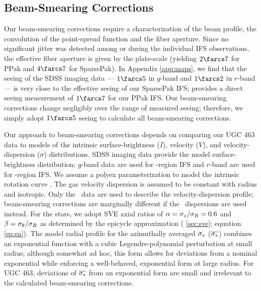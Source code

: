 \documentclass[apj,iop,numberedappendix]{emulateapj}
\begin{document}
\subsection{Beam-Smearing Corrections}
\label{sec:beamc}

Our beam-smearing corrections require a characterization of the beam profile,
the convolution of the point-spread function and the fiber aperture.  Since no
significant jitter was detected among or during the individual IFS observations,
the effective fiber aperture is given by the plate-scale (yielding $2\farcs7$
for PPak and $4\farcs7$ for SparsePak).  In Appendix \ref{app:maps}, we find
that the seeing of the SDSS imaging data --- $1\farcs5$ in $g$-band and
$1\farcs2$ in $r$-band --- is very close to the effective seeing of our
SparsePak IFS; \citet{TPKMPhD} provides a direct seeing measurement of
$1\farcs7$ for our PPak IFS.  Our beam-smearing corrections change negligibly
over the range of measured seeing; therefore, we simply adopt $1\farcs5$ seeing
to calculate all beam-smearing corrections.

Our approach to beam-smearing corrections 
depends on comparing our UGC 463 data to models of the intrinsic
surface-brightness ($I$), velocity ($V$), and velocity-dispersion ($\sigma$)
distributions.  SDSS imaging data provide the model surface-brightness
distribution; $g$-band data are used for \mgi-region IFS and $r$-band are used
for \halp-region IFS.  We assume a polyex parameterization to model the
intrinsic rotation curve \citep{2002ApJ...571L.107G}.  The gas velocity
dispersion is assumed to be constant with radius and isotropic.  Only the \halp\
data are used to describe the velocity-dispersion profile; beam-smearing
corrections are marginally different if the \oiii\ dispersions are used instead.
For the stars, we adopt SVE axial ratios of $\alpha = \sigma_z/\sigma_R = 0.6$ and
$\beta = \sigma_{\theta}/\sigma_R$ as determined by the epicycle approximation (\sect
\ref{sec:sve}; equation \ref{eq:ea}).  The model radial profile for the
azimuthally averaged $\sigma_{\ast}$ ($\overline{\sigma_{\ast}}$) combines an exponential
function with a cubic Legendre-polynomial perturbation at small radius; although
somewhat ad hoc, this form allows for deviations from a nominal exponential
while enforcing a well-behaved, exponential form at large radius.  For UGC 463,
deviations of $\overline{\sigma_{\ast}}$ from an exponential form are small and
irrelevant to the calculated beam-smearing corrections.
\end{document}
